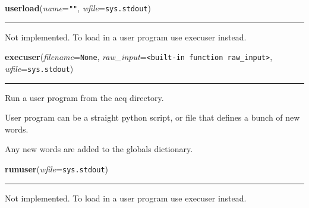     \begin{boxedminipage}{\textwidth}

    \raggedright \textbf{userload}(\textit{name}=\texttt{""}, \textit{wfile}=\texttt{sys.stdout})

    \vspace{-1.5ex}

    \rule{\textwidth}{0.5\fboxrule}
    Not implemented. To load in a user program use execuser instead.

    \vspace{1ex}

    \end{boxedminipage}

    \label{pydsp:execuser}

    \vspace{0.5ex}

    \begin{boxedminipage}{\textwidth}

    \raggedright \textbf{execuser}(\textit{filename}=\texttt{None}, \textit{raw\_input}=\texttt{{\textless}built-in function raw\_input{\textgreater}}, \textit{wfile}=\texttt{sys.stdout})

    \vspace{-1.5ex}

    \rule{\textwidth}{0.5\fboxrule}
    Run a user program from the acq directory.

    User program can be a straight python script, or file that defines a 
    bunch of new words.

    Any new words are added to the globals dictionary.

    \vspace{1ex}

    \end{boxedminipage}

    \label{pydsp:runuser}

    \vspace{0.5ex}

    \begin{boxedminipage}{\textwidth}

    \raggedright \textbf{runuser}(\textit{wfile}=\texttt{sys.stdout})

    \vspace{-1.5ex}

    \rule{\textwidth}{0.5\fboxrule}
    Not implemented. To load in a user program use execuser instead.

    \vspace{1ex}

    \end{boxedminipage}

